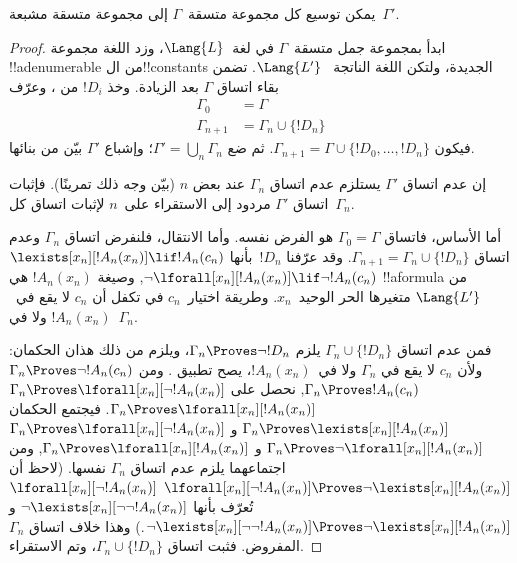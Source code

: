 \documentclass[../../../include/open-logic-section]{subfiles}
\begin{document}
\begin{lem}
يمكن توسيع كل مجموعة متسقة~$\Gamma$ إلى مجموعة متسقة مشبعة~$\Gamma'$.
\end{lem}

\begin{proof}
ابدأ بمجموعة جمل متسقة~$\Gamma$ في لغة~$\Lang{L}$، وزد اللغة مجموعة
!!a{denumerable} من ال!!{constant}s الجديدة، ولتكن اللغة الناتجة
~$\Lang{L'}$. تضمن  بقاء اتساق $\Gamma$ بعد
الزيادة. وخذ $!D_i$ من ، وعرّف
\begin{align*}
\Gamma_0 & = \Gamma \\
\Gamma_{n+1} & = \Gamma_n \cup \{!D_n \}
\end{align*}
فيكون $\Gamma_{n+1} = \Gamma \cup \{ !D_0, \dots, !D_n \}$. ثم ضع
$\Gamma' = \bigcup_{n} \Gamma_n$؛ وإشباع $\Gamma'$ بيّن من بنائها.

إن عدم اتساق $\Gamma'$ يستلزم عدم اتساق $\Gamma_n$ عند بعض $n$
(بيّن وجه ذلك تمرينًا). فإثبات اتساق $\Gamma'$ مردود إلى الاستقراء
على~$n$ لإثبات اتساق كل~$\Gamma_n$.

أما الأساس، فاتساق $\Gamma_0 = \Gamma$ هو الفرض نفسه. وأما الانتقال،
فلنفرض اتساق $\Gamma_{n}$ وعدم اتساق
$\Gamma_{n+1} = \Gamma_n \cup \{!D_n\}$. وقد عرّفنا $!D_n$~بأنها
{$\lexists[x_{n}][!A_{n}(x_n)] \lif !A_{n}(c_{n})$}
{$\lnot\lforall[x_{n}][!A_{n}(x_n)] \lif \lnot !A_{n}(c_{n})$},
وصيغة $!A_n(x_n)$ هي !!a{formula} من $\Lang{L'}$ متغيرها الحر
الوحيد~$x_n$. وطريقة اختيار~$c_n$ في
 تكفل أن $c_n$ لا يقع في~$!A_n(x_n)$ ولا في~$\Gamma_n$.

فمن عدم اتساق $\Gamma_n \cup \{!D_n\}$ يلزم $\Gamma_n
\Proves \lnot !D_n$، ويلزم من ذلك هذان الحكمان:
ولأن $c_n$ لا يقع في $\Gamma_n$ ولا في~$!A_n(x_n)$، يصح تطبيق
.
ومن 
{$\Gamma_n \Proves \lnot !A_n(c_n)$}
{$\Gamma_n \Proves !A_n(c_n)$},
نحصل على
{$\Gamma_n \Proves \lforall[x_n][\lnot !A_n(x_n)]$}
{$\Gamma_n \Proves \lforall[x_n][!A_n(x_n)]$}.
فيجتمع الحكمان
{$\Gamma_n \Proves \lexists[x_n][!A_n(x_n)]$ و
$\Gamma_n \Proves \lforall[x_n][\lnot !A_n(x_n)]$}
{$\Gamma_n \Proves \lnot\lforall[x_n][!A_n(x_n)]$ و
$\Gamma_n \Proves \lforall[x_n][!A_n(x_n)]$},
ومن اجتماعهما يلزم عدم اتساق $\Gamma_n$ نفسها.
{(لاحظ أن
{$\lforall[x_n][\lnot !A_n(x_n)] \Proves
  \lnot\lexists[x_n][!A_n(x_n)]$}
{$\lforall[x_n][\lnot !A_n(x_n)]$ تُعرّف بأنها
  $\lnot\lexists[x_n][\lnot\lnot !A_n(x_n)]$ و
  $\lnot\lexists[x_n][\lnot\lnot !A_n(x_n)] \Proves
  \lnot\lexists[x_n][!A_n(x_n)]$}.)}{}
وهذا خلاف اتساق $\Gamma_n$ المفروض. فثبت اتساق
$\Gamma_n \cup \{ !D_n\}$، وتم الاستقراء.
\end{proof}
\end{document}
